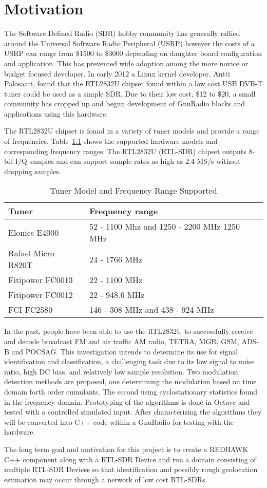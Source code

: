 \chapter{Motivation}

The Software Defined Radio (SDR) hobby community has generally rallied around
the Universal Software Radio Peripheral (USRP) however the costs of a USRP can
range from \$1500 to \$3000 depending on daughter board configuration and
application.  This has prevented wide adoption among the more novice or budget
focused developer. In early 2012 a Linux kernel developer, Antti Palosaari, found
that the RTL2832U chipset found within a low cost USB DVB-T tuner
could be used as a simple SDR.  Due to their low cost, \$12 to \$20, a
small community has cropped up and begun development of GnuRadio blocks and
applications using this hardware.

The RTL2832U chipset is found in a variety of tuner models and provide a range of frequencies.
Table~\ref{tab:ModelAndFreq} shows the supported hardware models and
corresponding frequency ranges.  The RTL2832U (RTL-SDR) chipset outputs 8-bit
I/Q samples and can support sample rates as high as 2.4 MS/s without dropping samples.  

\begin{table}
\caption{Tuner Model and Frequency Range Supported}
\begin{tabular}{| l | l |} \hline
Tuner	& Frequency range \\ \hline
Elonics E4000	& 52 - 1100 Mhz and 1250 - 2200 MHz 1250 MHz \\ \hline
Rafael Micro R820T &	24 - 1766 MHz \\ \hline
Fitipower FC0013 & 22 - 1100 MHz  \\ \hline
Fitipower FC0012 &	22 - 948.6 MHz \\ \hline
FCI FC2580	& 146 - 308 MHz and 438 - 924 MHz \\ \hline
\end{tabular}
\label{tab:ModelAndFreq}
\end{table}

In the past, people have been able to use the RTL2832U to successfully
receive and decode broadcast FM and air traffic AM radio, TETRA, MGR, GSM, ADS-B
and POCSAG.  This investigation intends to determine its use for signal
identification and classification, a challenging task due to its low signal to
noise ratio, high DC bias, and relatively low sample resolution.  Two
modulation detection methods are proposed, one determining the modulation
based on time domain forth order cumulants.  The second using cyclostationary
statistics found in the frequency domain.  Prototyping of the algorithms
is done in Octave and tested with a controlled simulated input. 
After characterizing the algorithms they will be converted into C++ code
within a GnuRadio for testing with the hardware. 

The long term goal and motivation for this project is to create a REDHAWK C++
component along with a RTL-SDR Device and run a domain consisting of multiple
RTL-SDR Devices so that identification and possibly rough geolocation 
estimation may occur through a network of low cost RTL-SDRs.

